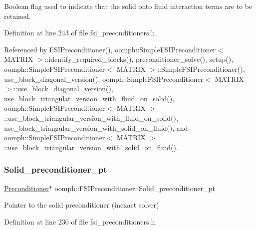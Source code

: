 Boolean flag used to indicate that the solid onto fluid interaction terms are to be retained. 



Definition at line 243 of file fsi\+\_\+preconditioners.\+h.



Referenced by F\+S\+I\+Preconditioner(), oomph\+::\+Simple\+F\+S\+I\+Preconditioner$<$ M\+A\+T\+R\+I\+X $>$\+::identify\+\_\+required\+\_\+blocks(), preconditioner\+\_\+solve(), setup(), oomph\+::\+Simple\+F\+S\+I\+Preconditioner$<$ M\+A\+T\+R\+I\+X $>$\+::\+Simple\+F\+S\+I\+Preconditioner(), use\+\_\+block\+\_\+diagonal\+\_\+version(), oomph\+::\+Simple\+F\+S\+I\+Preconditioner$<$ M\+A\+T\+R\+I\+X $>$\+::use\+\_\+block\+\_\+diagonal\+\_\+version(), use\+\_\+block\+\_\+triangular\+\_\+version\+\_\+with\+\_\+fluid\+\_\+on\+\_\+solid(), oomph\+::\+Simple\+F\+S\+I\+Preconditioner$<$ M\+A\+T\+R\+I\+X $>$\+::use\+\_\+block\+\_\+triangular\+\_\+version\+\_\+with\+\_\+fluid\+\_\+on\+\_\+solid(), use\+\_\+block\+\_\+triangular\+\_\+version\+\_\+with\+\_\+solid\+\_\+on\+\_\+fluid(), and oomph\+::\+Simple\+F\+S\+I\+Preconditioner$<$ M\+A\+T\+R\+I\+X $>$\+::use\+\_\+block\+\_\+triangular\+\_\+version\+\_\+with\+\_\+solid\+\_\+on\+\_\+fluid().

\mbox{\label{classoomph_1_1FSIPreconditioner_a9a6616d03bd67e2c1c406bcb6d332893}} 
\subsubsection{\texorpdfstring{Solid\+\_\+preconditioner\+\_\+pt}{Solid\_preconditioner\_pt}}
{\footnotesize\ttfamily \hyperlink{classoomph_1_1Preconditioner}{Preconditioner}$\ast$ oomph\+::\+F\+S\+I\+Preconditioner\+::\+Solid\+\_\+preconditioner\+\_\+pt\hspace{0.3cm}{\ttfamily [private]}}



Pointer to the solid preconditioner (inexact solver) 



Definition at line 230 of file fsi\+\_\+preconditioners.\+h.



